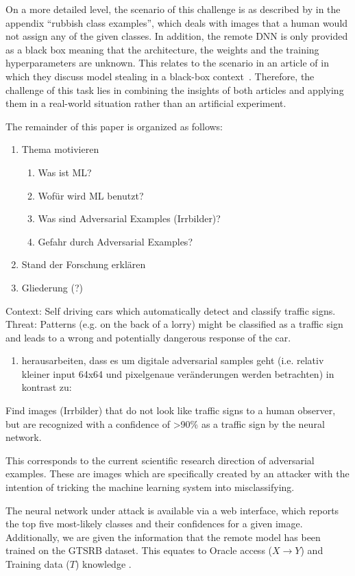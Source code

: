 On a more detailed level, the scenario of this challenge is as described by \citeauthor{szegedy2015explaining} in the appendix \enquote{rubbish class examples}\cite{szegedy2015explaining}, which deals with images that a human would not assign any of the given classes.
In addition, the remote DNN is only provided as a black box meaning that the architecture, the weights and the training hyperparameters are unknown.
This relates to the scenario in an article of \citeauthor{papernot2017practical} in which they discuss model stealing in a black-box context~\cite{papernot2017practical}.
Therefore, the challenge of this task lies in combining the insights of both articles and applying them in a real-world situation rather than an artificial experiment.

The remainder of this paper is organized as follows:


\begin{enumerate}
\item Thema motivieren
\begin{enumerate}
\item Was ist ML?
\item Wofür wird ML benutzt?
\item Was sind Adversarial Examples (Irrbilder)?
\item Gefahr durch Adversarial Examples?
\end{enumerate}
\item Stand der Forschung erklären
\item Gliederung (?)
\end{enumerate}


Context: Self driving cars which automatically detect and classify traffic signs.
Threat: Patterns (e.g. on the back of a lorry) might be classified as a traffic sign and leads to a wrong and potentially dangerous response of the car.

\begin{enumerate}
\item herausarbeiten, dass es um digitale adversarial samples geht
(i.e. relativ kleiner input 64x64 und pixelgenaue veränderungen werden betrachten)
in kontrast zu: \cite{eykholt2018robust}
\end{enumerate}

Find images (Irrbilder) that do not look like traffic signs to a human observer,
but are recognized with a confidence of >90\% as a traffic sign by the neural network.

This corresponds to the current scientific research direction of adversarial examples.
These are images which are specifically created by an attacker with the intention of tricking the machine learning system into misclassifying.

The neural network under attack is available via a web interface,
which reports the top five most-likely classes and their confidences for a given image.
Additionally, we are given the information that the remote model has been trained on the GTSRB dataset.
This equates to Oracle access ($X \rightarrow Y$) and Training data ($T$) knowledge \cite{papernot2016limitations}.



